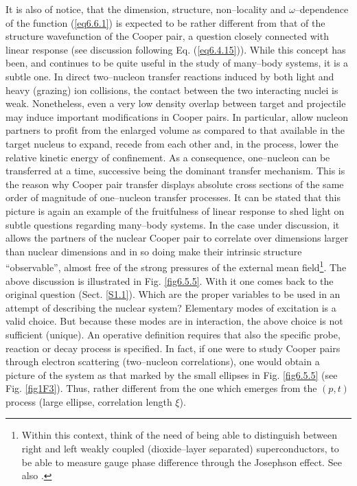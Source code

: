 It is also of notice, that the dimension, structure, non--locality and $\omega$--dependence of the function (\ref{eq6.6.1}) is expected to be rather different from that of the structure wavefunction of the Cooper pair, a question closely connected with linear response (see discussion following Eq. (\ref{eq6.4.15})). While this concept has been, and continues to be quite useful in the study of many--body systems, it is a subtle one. In direct two--nucleon transfer reactions induced by both light and heavy (grazing) ion  collisions, the contact between the two interacting nuclei is weak. Nonetheless, even a very low density overlap between target and projectile may induce important modifications in Cooper pairs. In particular, allow nucleon partners to profit from the enlarged volume as compared to that available in the target nucleus to expand, recede from each other and, in the process, lower the relative kinetic energy of confinement. As a consequence, one--nucleon can be transferred at a time, successive being the dominant transfer mechanism. This is the reason why Cooper pair transfer displays absolute cross sections of the same order of magnitude of one--nucleon transfer processes. It can be stated that this picture is again an example of the fruitfulness of linear response to shed light on subtle questions regarding many--body systems. In the case under discussion, it allows the partners of the nuclear Cooper pair to correlate over dimensions larger than nuclear dimensions and in so doing make their intrinsic structure ``observable'', almost free of the strong pressures of the external mean field\footnote{Within this context, think of the need of being able to distinguish between   right and left weakly coupled (dioxide--layer separated) superconductors,  to be able to measure gauge phase difference through the Josephson effect. See also \cite{Magierski:17}.}. The above discussion is illustrated in Fig. \ref{fig6.5.5}. With it one comes back to the original question (Sect. \ref{S1.1}). Which are the proper variables to be used in an attempt of describing the nuclear system? Elementary modes of excitation is a valid choice. But because these modes are in interaction, the above choice is not sufficient (unique). An operative definition requires that also the specific probe, reaction or decay process is specified. In fact, if one were to study Cooper pairs through electron scattering (two--nucleon correlations), one would obtain a picture of the system as that marked by the small ellipses in Fig. \ref{fig6.5.5} (see Fig. \ref{fig1F3}). Thus, rather different from the one  which emerges from the $(p,t)$ process (large ellipse, correlation length $\xi$).  
